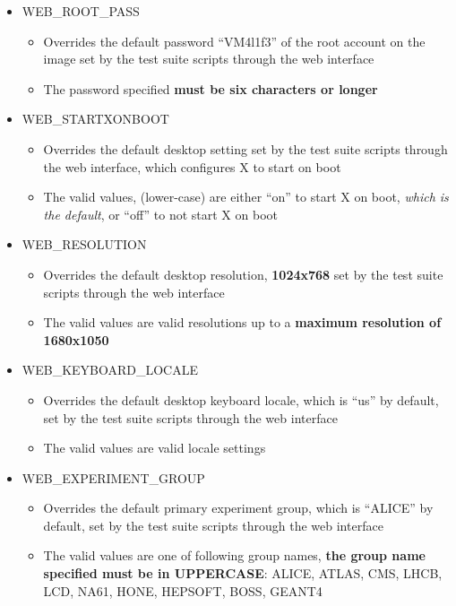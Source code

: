 \begin{itemize}
\item	WEB\_ROOT\_PASS
		\begin{itemize}
		\item	Overrides the default password ``VM4l1f3'' of the root account
				on the \cernvm image set by the test suite scripts through the
				web interface
		\item	The password specified {\bf must be six characters or longer}
		\end{itemize}
		
\item	WEB\_STARTXONBOOT
		\begin{itemize}
		\item	Overrides the default \cernvm desktop setting set by the test 
				suite scripts through the web interface, which configures X to
				start on boot
		\item	The valid values, (lower-case) are either ``on'' to start X on boot,
				\emph{which is the default}, or ``off'' to not start X on boot		
		\end{itemize}
				
\item	WEB\_RESOLUTION
		\begin{itemize}
		\item	Overrides the default \cernvm desktop resolution, {\bf 1024x768} set by
				the test suite scripts through the web interface
		\item	The valid values are valid resolutions up to a {\bf maximum resolution
				of 1680x1050}
		\end{itemize}

\item	WEB\_KEYBOARD\_LOCALE
		\begin{itemize}
		\item	Overrides the default \cernvm desktop keyboard locale, which is ``us'' by
				default, set by the test suite scripts through the web interface
		\item	The valid values are valid locale settings
		\end{itemize}

\item	WEB\_EXPERIMENT\_GROUP
		\begin{itemize}
		\item	Overrides the default \cernvm primary experiment group, which is ``ALICE''
				by default, set by the test suite scripts through the web interface
		\item	The valid values are one of following group names, {\bf the group name
				specified must be in UPPERCASE}: ALICE, ATLAS, CMS, LHCB, LCD, NA61, HONE,
				HEPSOFT, BOSS, GEANT4	
		\end{itemize}
\end{itemize}


